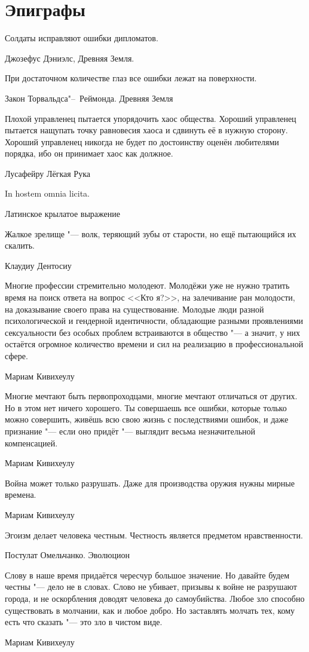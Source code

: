 \chapter{Эпиграфы}

\epigraph
{Солдаты исправляют ошибки дипломатов.}
{Джозефус Дэниэлс, Древняя Земля.}

\epigraph
{При достаточном количестве глаз все ошибки лежат на поверхности.}
{Закон Торвальдса"--~Реймонда. Древняя Земля}

\epigraph
{Плохой управленец пытается упорядочить хаос общества.
Хороший управленец пытается нащупать точку равновесия хаоса и сдвинуть её в нужную сторону.
Хороший управленец никогда не будет по достоинству оценён любителями порядка, ибо он принимает хаос как должное.}
{Лусафейру Лёгкая Рука}

\epigraph
{In hostem omnia licita.}
{Латинское крылатое выражение}

\epigraph
{Жалкое зрелище "--- волк, теряющий зубы от старости, но ещё пытающийся их скалить.}
{Клаудиу Дентосиу}

\epigraph
{Многие профессии стремительно молодеют.
Молодёжи уже не нужно тратить время на поиск ответа на вопрос <<Кто я?>>, на залечивание ран молодости, на доказывание своего права на существование.
Молодые люди разной психологической и гендерной идентичности, обладающие разными проявлениями сексуальности без особых проблем встраиваются в общество "--- а значит, у них остаётся огромное количество времени и сил на реализацию в профессиональной сфере.}
{Мариам Кивихеулу}

\epigraph
{Многие мечтают быть первопроходцами, многие мечтают отличаться от других.
Но в этом нет ничего хорошего.
Ты совершаешь все ошибки, которые только можно совершить, живёшь всю свою жизнь с последствиями ошибок, и даже признание "--- если оно придёт "--- выглядит весьма незначительной компенсацией.}
{Мариам Кивихеулу}

\epigraph
{Война может только разрушать.
Даже для производства оружия нужны мирные времена.}
{Мариам Кивихеулу}

\epigraph
{Эгоизм делает человека честным.
Честность является предметом нравственности.}
{Постулат Омельчанко.
Эволюцион}

\epigraph
{Слову в наше время придаётся чересчур большое значение.
Но давайте будем честны "--- дело не в словах.
Слово не убивает, призывы к войне не разрушают города,  и не оскорбления доводят человека до самоубийства.
Любое зло способно существовать в молчании, как и любое добро.
Но заставлять молчать тех, кому есть что сказать "--- это зло в чистом виде.}
{Мариам Кивихеулу}

